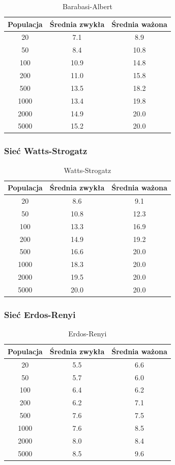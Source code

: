 \documentclass{wfiisul}
\begin{document}
\begin{table}[htbp]
  \centering
  \begin{tabular}{c|c|c}
    \hline
    Populacja & Średnia zwykła & Średnia ważona \\
    \hline
    20 & 7.1 & 8.9 \\
    50 & 8.4 & 10.8 \\
    100 & 10.9 & 14.8 \\
    200 & 11.0 & 15.8 \\
    500 & 13.5 & 18.2 \\
    1000 & 13.4 & 19.8 \\
    2000 & 14.9 & 20.0 \\
    5000 & 15.2 & 20.0 \\
  \end{tabular}
  \caption{Barabasi-Albert}
  \label{tab:barabasi_albert}
\end{table}

\subsubsection{Sieć Watts-Strogatz}

\begin{table}[htbp]
  \centering
  \begin{tabular}{c|c|c}
    \hline
    Populacja & Średnia zwykła & Średnia ważona \\
    \hline
    20 & 8.6 & 9.1 \\
    50 & 10.8 & 12.3 \\
    100 & 13.3 & 16.9 \\
    200 & 14.9 & 19.2 \\
    500 & 16.6 & 20.0 \\
    1000 & 18.3 & 20.0 \\
    2000 & 19.5 & 20.0 \\
    5000 & 20.0 & 20.0 \\
  \end{tabular}
  \caption{Watts-Strogatz}
  \label{tab:watts_strogatz}
\end{table}

\subsubsection{Sieć Erdos-Renyi}

\begin{table}[htbp]
  \centering
  \begin{tabular}{c|c|c}
    \hline
    Populacja & Średnia zwykła & Średnia ważona \\
    \hline
    20 & 5.5 & 6.6 \\
    50 & 5.7 & 6.0 \\
    100 & 6.4 & 6.2 \\
    200 & 6.2 & 7.1 \\
    500 & 7.6 & 7.5 \\
    1000 & 7.6 & 8.5 \\
    2000 & 8.0 & 8.4 \\
    5000 & 8.5 & 9.6 \\
  \end{tabular}
  \caption{Erdos-Renyi}
  \label{tab:erdos_renyi}
\end{table}
\end{document}

